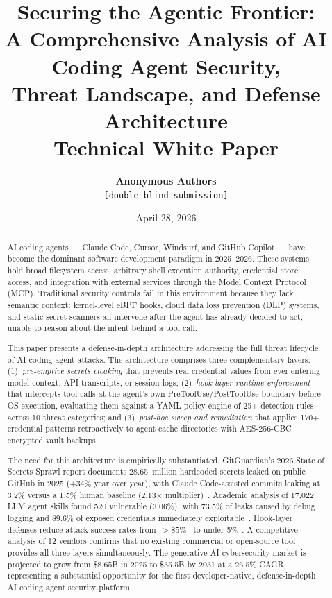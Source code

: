 \documentclass[11pt,letterpaper]{article}
\title{
    \vspace{-1cm}
    {\Large\bfseries\color{prismorblue} Securing the Agentic Frontier:}\\
    \vspace{0.3em}
    {\large A Comprehensive Analysis of AI Coding Agent Security,\\
    Threat Landscape, and Defense Architecture}\\
    \vspace{0.5em}
    \normalsize\color{prismorgray}
    Technical White Paper\\
    \vspace{0.3em}
}
\author{
    \textbf{Anonymous Authors}\\
    \small\texttt{[double-blind submission]}\\
    \vspace{0.5em}
}
\date{\small April 28, 2026}
\begin{document}
\maketitle
\thispagestyle{fancy}

\begin{abstract}
AI coding agents --- Claude Code, Cursor, Windsurf, and GitHub Copilot --- have become
the dominant software development paradigm in 2025--2026. These systems hold broad
filesystem access, arbitrary shell execution authority, credential store access, and
integration with external services through the Model Context Protocol (MCP). Traditional
security controls fail in this environment because they lack semantic context: kernel-level
eBPF hooks, cloud data loss prevention (DLP) systems, and static secret scanners all
intervene after the agent has already decided to act, unable to reason about the intent
behind a tool call.

This paper presents a defense-in-depth architecture addressing the full threat lifecycle
of AI coding agent attacks. The architecture comprises three complementary layers:
(1)~\emph{pre-emptive secrets cloaking} that prevents real credential values from ever
entering model context, API transcripts, or session logs; (2)~\emph{hook-layer runtime
enforcement} that intercepts tool calls at the agent's own PreToolUse/PostToolUse
boundary before OS execution, evaluating them against a YAML policy engine of 25+
detection rules across 10 threat categories; and (3)~\emph{post-hoc sweep and
remediation} that applies 170+ credential patterns retroactively to agent cache
directories with AES-256-CBC encrypted vault backups.

The need for this architecture is empirically substantiated. GitGuardian's 2026 State of
Secrets Sprawl report documents 28.65~million hardcoded secrets leaked on public GitHub
in 2025 ($+34\%$ year over year), with Claude Code-assisted commits leaking at 3.2\%
versus a 1.5\% human baseline (2.13$\times$ multiplier)~\citep{gitguardian2026state}.
Academic analysis of 17,022 LLM agent skills found 520 vulnerable (3.06\%), with 73.5\%
of leaks caused by debug logging and 89.6\% of exposed credentials immediately
exploitable~\citep{chen2026credential}. Hook-layer defenses reduce attack success rates
from~${>}85\%$~\citep{maloyan2026prompt} to under 5\%~\citep{zhao2026clawguard}.
A competitive analysis of 12 vendors confirms that no existing commercial or open-source
tool provides all three layers simultaneously. The generative AI cybersecurity market is
projected to grow from \$8.65B in 2025 to \$35.5B by 2031 at a 26.5\% CAGR, representing
a substantial opportunity for the first developer-native, defense-in-depth AI coding
agent security platform.
\end{abstract}
\end{document}
